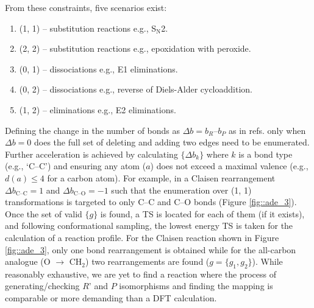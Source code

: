 \documentclass[../../main.tex]{subfiles}
\begin{document}
\newpage
From these constraints, five scenarios exist: 

\begin{enumerate}[label=\Roman*.]
	\item (1, 1) – substitution reactions e.g., S${}_\text{N}$2.
	\item (2, 2) – substitution reactions e.g., epoxidation with peroxide.
	\item (0, 1) – dissociations e.g., E1 eliminations.
	\item (0, 2) – dissociations e.g., reverse of Diels-Alder cycloaddition.
	\item 	(1, 2) – eliminations e.g., E2 eliminations.
\end{enumerate}

Defining the change in the number of bonds as $\Delta b = b_R – b_P$ as in refs. \cite{Jacobson2017,Crabtree2009} only when $\Delta b = 0$ does the full set of deleting and adding two edges need to be enumerated. Further acceleration is achieved by calculating $\{\Delta b_k\}$ where $k$ is a bond type (e.g., ‘C--C’) and ensuring any atom ($a$) does not exceed a maximal valence (e.g., $d(a) \le 4$ for a carbon atom). For example, in a Claisen rearrangement $\Delta b_\text{C--C} = 1$ and $\Delta b_\text{C--O} = -1$ such that the enumeration over (1, 1) transformations is targeted to only C–C and C–O bonds (Figure \ref{fig::ade_3}). Once the set of valid $\{g\}$ is found, a TS is located for each of them (if it exists), and following conformational sampling, the lowest energy TS is taken for the calculation of a reaction profile. For the Claisen reaction shown in Figure \ref{fig::ade_3}, only one bond rearrangement is obtained while for the all-carbon analogue (O $\rightarrow$ CH$_2$) two rearrangements are found ($g = \{g_1, g_2\}$). While reasonably exhaustive, we are yet to find a reaction where the process of generating/checking $R’$ and $P$ isomorphisms and finding the mapping is comparable or more demanding than a DFT calculation.
\end{document}
